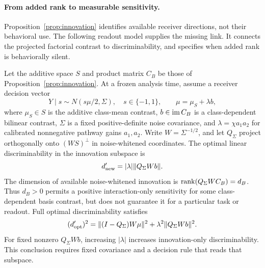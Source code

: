 \paragraph{From added rank to measurable sensitivity.} Proposition~\ref{prop:innovation} identifies available receiver directions, not their behavioral use. The following readout model supplies the missing link. It connects the projected factorial contrast to discriminability, and specifies when added rank is behaviorally silent.

\begin{corollary}\label{cor:rank-sensitivity}
Let the additive space $S$ and product matrix $C_B$ be those of Proposition~\ref{prop:innovation}. At a frozen analysis time, assume a receiver decision vector
\[
Y\mid s\sim N(s\mu/2,\Sigma),\quad s\in\{-1,1\},\qquad
\mu=\mu_S+\lambda b,
\]
where $\mu_S\in S$ is the additive class-mean contrast, $b\in\operatorname{im} C_B$ is a class-dependent bilinear contrast, $\Sigma$ is a fixed positive-definite noise covariance, and $\lambda=\chi a_1a_2$ for calibrated nonnegative pathway gains $a_1,a_2$. Write $W=\Sigma^{-1/2}$, and let $Q_\Sigma$ project orthogonally onto $(WS)^\perp$ in noise-whitened coordinates. The optimal linear discriminability in the innovation subspace is
\begin{equation}
d'_{\rm new}=|\lambda|\|Q_\Sigma Wb\|.\label{eq:innovation-sensitivity}
\end{equation}
The dimension of available noise-whitened innovation is $\operatorname{rank}(Q_\Sigma WC_B)=d_B$. Thus $d_B>0$ permits a positive interaction-only sensitivity for some class-dependent basis contrast, but does not guarantee it for a particular task or readout. Full optimal discriminability satisfies
\[
(d'_{\rm opt})^2=\|(I-Q_\Sigma)W\mu\|^2
+\lambda^2\|Q_\Sigma Wb\|^2.
\]
For fixed nonzero $Q_\Sigma Wb$, increasing $|\lambda|$ increases innovation-only discriminability. This conclusion requires fixed covariance and a decision rule that reads that subspace.
\end{corollary}
